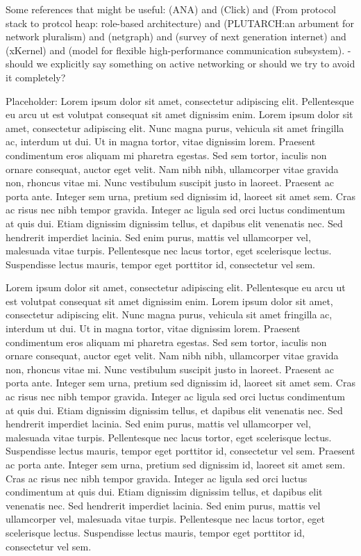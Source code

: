 \documentclass{sig-alternate}
\begin{document}
Some references that might be useful: \cite{ANAJournal} (ANA) and \cite{click} (Click) and \cite{rba} (From protocol stack to protcol heap: role-based architecture) and \cite{Plutarch} (PLUTARCH:an arbument for network pluralism) and \cite{netgraph} (netgraph) and \cite{raj} (survey of next generation internet) and \cite{xKernel} (xKernel) and \cite{Zitterbart} (model for flexible high-performance communication subsystem). - should we explicitly say something on active networking or should we try to avoid it completely?


Placeholder: Lorem ipsum dolor sit amet, consectetur adipiscing elit. Pellentesque eu arcu ut est volutpat consequat sit amet dignissim enim. Lorem ipsum dolor sit amet, consectetur adipiscing elit. Nunc magna purus, vehicula sit amet fringilla ac, interdum ut dui. Ut in magna tortor, vitae dignissim lorem. Praesent condimentum eros aliquam mi pharetra egestas. Sed sem tortor, iaculis non ornare consequat, auctor eget velit. Nam nibh nibh, ullamcorper vitae gravida non, rhoncus vitae mi. Nunc vestibulum suscipit justo in laoreet. Praesent ac porta ante. Integer sem urna, pretium sed dignissim id, laoreet sit amet sem. Cras ac risus nec nibh tempor gravida. Integer ac ligula sed orci luctus condimentum at quis dui. Etiam dignissim dignissim tellus, et dapibus elit venenatis nec. Sed hendrerit imperdiet lacinia. Sed enim purus, mattis vel ullamcorper vel, malesuada vitae turpis. Pellentesque nec lacus tortor, eget scelerisque lectus. Suspendisse lectus mauris, tempor eget porttitor id, consectetur vel sem.

 Lorem ipsum dolor sit amet, consectetur adipiscing elit. Pellentesque eu arcu ut est volutpat consequat sit amet dignissim enim. Lorem ipsum dolor sit amet, consectetur adipiscing elit. Nunc magna purus, vehicula sit amet fringilla ac, interdum ut dui. Ut in magna tortor, vitae dignissim lorem. Praesent condimentum eros aliquam mi pharetra egestas. Sed sem tortor, iaculis non ornare consequat, auctor eget velit. Nam nibh nibh, ullamcorper vitae gravida non, rhoncus vitae mi. Nunc vestibulum suscipit justo in laoreet. Praesent ac porta ante. Integer sem urna, pretium sed dignissim id, laoreet sit amet sem. Cras ac risus nec nibh tempor gravida. Integer ac ligula sed orci luctus condimentum at quis dui. Etiam dignissim dignissim tellus, et dapibus elit venenatis nec. Sed hendrerit imperdiet lacinia. Sed enim purus, mattis vel ullamcorper vel, malesuada vitae turpis. Pellentesque nec lacus tortor, eget scelerisque lectus. Suspendisse lectus mauris, tempor eget porttitor id, consectetur vel sem. 
Praesent ac porta ante. Integer sem urna, pretium sed dignissim id, laoreet sit amet sem. Cras ac risus nec nibh tempor gravida. Integer ac ligula sed orci luctus condimentum at quis dui. Etiam dignissim dignissim tellus, et dapibus elit venenatis nec. Sed hendrerit imperdiet lacinia. Sed enim purus, mattis vel ullamcorper vel, malesuada vitae turpis. Pellentesque nec lacus tortor, eget scelerisque lectus. Suspendisse lectus mauris, tempor eget porttitor id, consectetur vel sem. 
\end{document}
